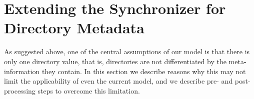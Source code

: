 
\section{Extending the Synchronizer for Directory Metadata}

As suggested above, one of the central assumptions of our model is that
there is only one directory value, that is, directories are not differentiated
by the meta-information they contain.
In this section we describe reasons why this may not limit the applicability
of even the current model, and we describe pre- and post-processing steps
to overcome this limitation.

